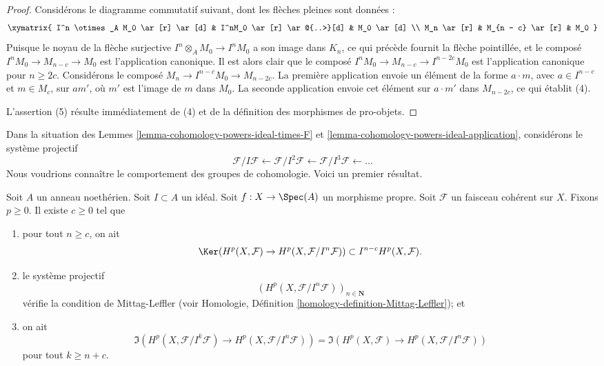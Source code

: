 \begin{proof}
\medskip\noindent
Considérons le diagramme commutatif suivant, dont les flèches pleines sont données :
$$
\xymatrix{
I^n \otimes_A M_0 \ar[r] \ar[d] &
I^nM_0 \ar[r] \ar@{..>}[d] &
M_0 \ar[d] \\
M_n \ar[r] &
M_{n - c} \ar[r] &
M_0
}
$$
Puisque le noyau de la flèche surjective $I^n \otimes_A M_0 \to I^nM_0$
a son image dans $K_n$, ce qui précède fournit la flèche pointillée, et le
composé $I^nM_0 \to M_{n - c} \to M_0$ est l'application canonique.
Il est alors clair que le composé $I^nM_0 \to M_{n - c} \to I^{n - 2c}M_0$
est l'application canonique pour $n \geq 2c$. Considérons le composé
$M_n \to I^{n - c}M_0 \to M_{n - 2c}$. La première application
envoie un élément de la forme $a \cdot m$,
avec $a \in I^{n - c}$ et $m \in M_c$,
sur $a m'$, où $m'$ est l'image de $m$ dans $M_0$.
La seconde application envoie cet élément sur $a \cdot m'$ dans $M_{n - 2c}$,
ce qui établit (4).

\medskip\noindent
L'assertion (5) résulte immédiatement de (4) et de la définition des
morphismes de pro-objets.
\end{proof}

\noindent
Dans la situation des Lemmes \ref{lemma-cohomology-powers-ideal-times-F} et
\ref{lemma-cohomology-powers-ideal-application}, considérons le
système projectif
$$
\mathcal{F}/I\mathcal{F} \leftarrow
\mathcal{F}/I^2\mathcal{F} \leftarrow
\mathcal{F}/I^3\mathcal{F} \leftarrow \ldots
$$
Nous voudrions connaître le comportement des groupes de cohomologie.
Voici un premier résultat.

\begin{lemma}
\label{lemma-ML-cohomology-powers-ideal}
Soit $A$ un anneau noethérien.
Soit $I \subset A$ un idéal.
Soit $f : X \to \Spec(A)$ un morphisme propre.
Soit $\mathcal{F}$ un faisceau cohérent sur $X$.
Fixons $p \geq 0$. Il existe $c \geq 0$ tel que
\begin{enumerate}
\item pour tout $n \geq c$, on ait
$$
\Ker(H^p(X, \mathcal{F}) \to H^p(X, \mathcal{F}/I^n\mathcal{F})) \subset
I^{n - c}H^p(X, \mathcal{F}).
$$
\item le système projectif
$$
\left(H^p(X, \mathcal{F}/I^n\mathcal{F})\right)_{n \in \mathbf{N}}
$$
vérifie la condition de Mittag-Leffler (voir
Homologie, Définition \ref{homology-definition-Mittag-Leffler}); et
\item on ait
$$
\Im(H^p(X, \mathcal{F}/I^k\mathcal{F})
\to H^p(X, \mathcal{F}/I^n\mathcal{F}))
=
\Im(H^p(X, \mathcal{F})
\to H^p(X, \mathcal{F}/I^n\mathcal{F}))
$$
pour tout $k \geq n + c$.
\end{enumerate}
\end{lemma}


